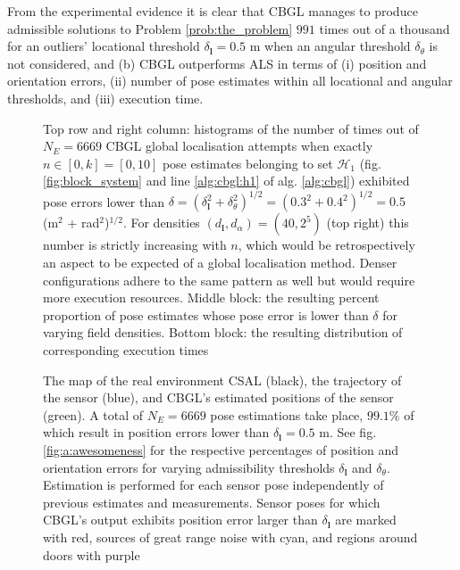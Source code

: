 From the experimental evidence it is clear that CBGL manages to produce
admissible solutions to Problem \ref{prob:the_problem} $991$ times out of a
thousand for an outliers' locational threshold $\delta_{\bm{l}} = 0.5$ m when
an angular threshold $\delta_{\theta}$ is not considered, and (b) CBGL
outperforms ALS in terms of (i) position and orientation errors, (ii) number of
pose estimates within all locational and angular thresholds, and (iii) execution
time.


\begin{figure}
  \vspace{-0.3cm}
  
  \vspace{-0.3cm}
  \caption{\small Top row and right column: histograms of the number of times
           out of $N_E = 6669$ CBGL global localisation attempts
           when exactly $n \in [0,k] = [0,10]$ pose estimates belonging to set
           $\mathcal{H}_1$ (fig. \ref{fig:block_system} and line
           \ref{alg:cbgl:h1} of alg. \ref{alg:cbgl}) exhibited pose errors
           lower than $\delta = (\delta_{\bm{l}}^2 + \delta_{\theta}^2)^{1/2} =
           (0.3^2 + 0.4^2)^{1/2} = 0.5$ (m$^2$ + rad$^2$)$^{1/2}$. For
           densities $(d_{\bm{l}},d_{\alpha}) = (40, 2^5)$ (top right) this
           number is strictly increasing with $n$, which would be
           retrospectively an aspect to be expected of a global localisation
           method. Denser configurations adhere to the same pattern as well but
           would require more execution resources. Middle block: the resulting
           percent proportion of pose estimates whose pose error is lower than
           $\delta$ for varying field densities. Bottom block: the resulting
           distribution of corresponding execution times
           }
  \vspace{-0.5cm}
  \label{fig:a:determine_40_32}
\end{figure}


\begin{figure}
  \vspace{-1.2cm}
  
  \vspace{-0.7cm}
  \caption{\small The map of the real environment CSAL (black), the trajectory
           of the sensor (blue), and CBGL's estimated positions of the sensor
           (green). A total of $N_E = 6669$ pose estimations take place,
           $99.1\%$ of which result in position errors lower than
           $\delta_{\bm{l}} = 0.5$ m. See fig. \ref{fig:a:awesomeness}
           for the respective percentages of position and orientation errors
           for varying admissibility thresholds $\delta_{\bm{l}}$ and
           $\delta_{\theta}$.
           Estimation is performed for each sensor
           pose independently of previous estimates and measurements. Sensor
           poses for which CBGL's output exhibits position error larger than
           $\delta_{\bm{l}}$ are marked with red, sources of great
           range noise with cyan, and regions around doors with purple
           }
  \label{fig:a:map_and_trajectory}
  \vspace{-0.5cm}
\end{figure}

